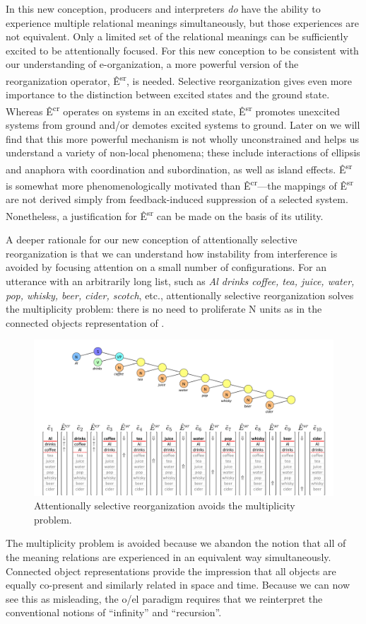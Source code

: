   In this new conception, producers and interpreters \textit{do} have the ability to experience multiple relational meanings simultaneously, but those experiences are not equivalent. Only a limited set of the relational meanings can be sufficiently excited to be attentionally focused. For this new conception to be consistent with our understanding of e-organization, a more powerful version of the reorganization operator, Ê\textsuperscript{sr},  is needed. Selective reorganization gives even more importance to the distinction between excited states and the ground state. Whereas Ê\textsuperscript{cr} operates on systems in an excited state, Ê\textsuperscript{sr} promotes unexcited systems from ground and/or demotes excited systems to ground. Later on we will find that this more powerful mechanism is not wholly unconstrained and helps us understand a variety of non-local phenomena; these include interactions of ellipsis and anaphora with coordination and subordination, as well as island effects. Ê\textsuperscript{sr} is somewhat more phenomenologically motivated than Ê\textsuperscript{cr}—the mappings of Ê\textsuperscript{sr} are not derived simply from feedback-induced suppression of a selected system. Nonetheless, a justification for Ê\textsuperscript{sr} can be made on the basis of its utility.

  A deeper rationale for our new conception of attentionally selective reorganization is that we can understand how instability from interference is avoided by focusing attention on a small number of configurations.  For an utterance with an arbitrarily long list, such as \textit{Al drinks coffee, tea, juice, water, pop, whisky, beer, cider, scotch}, etc., attentionally selective reorganization solves the multiplicity problem: there is no need to proliferate N units as in the connected objects representation of {}. 

  
\begin{figure}
\includegraphics[width=\textwidth]{figures/Tilsen-img104.png}
\caption{Attentionally selective reorganization avoids the multiplicity problem.}
\label{fig:4:54}
\end{figure}
 

  The multiplicity problem is avoided because we abandon the notion that all of the meaning relations are experienced in an equivalent way simultaneously. Connected object representations provide the impression that all objects are equally co-present and similarly related in space and time. Because we can now see this as misleading, the o/el paradigm requires that we reinterpret the conventional notions of “infinity” and “recursion”.


